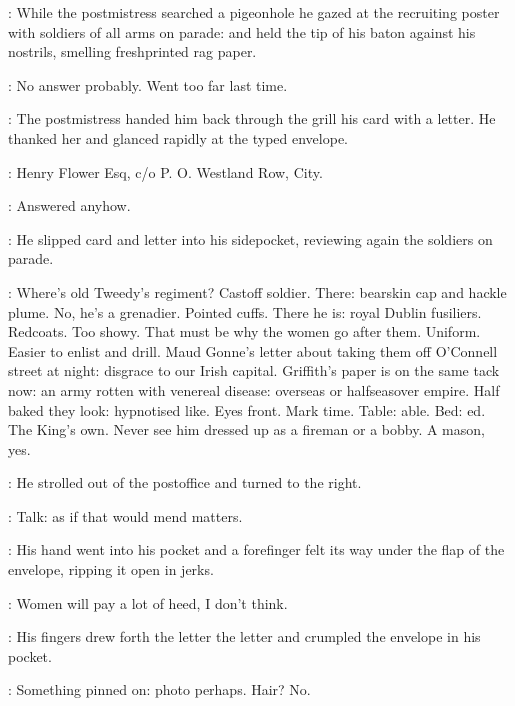 :
While the postmistress searched a pigeonhole
he gazed at the recruiting poster with soldiers of all arms on parade:
and held the tip of his baton against his nostrils,
smelling freshprinted rag paper.

\BloomInt:
No answer probably.
Went too far last time.

:
The postmistress handed him back through the grill
his card with a letter.
He thanked her and glanced rapidly at the typed envelope.

:
Henry Flower Esq,
c/o P. O. Westland Row,
City.

\BloomInt:
Answered anyhow.

:
He slipped card and letter into his sidepocket,
reviewing again the soldiers on parade.

\BloomInt:
Where's old Tweedy's regiment?
Castoff soldier.
There: bearskin cap and hackle plume.
No, he's a grenadier.
Pointed cuffs.
There he is: royal Dublin fusiliers.
Redcoats.
Too showy.
That must be why the women go after them.
Uniform.
Easier to enlist and drill.
Maud Gonne's letter about taking them off O'Connell street at night:
disgrace to our Irish capital.
Griffith's paper is on the same tack now:
an army rotten with venereal disease:
overseas or halfseasover empire.
Half baked they look:
hypnotised like.
Eyes front.
Mark time.
Table: able.
Bed: ed.
The King's own.
Never see him dressed up as a fireman or a bobby.
A mason, yes.

:
He strolled out of the postoffice and turned to the right.

\BloomInt:
Talk:
as if that would mend matters.

:
His hand went into his pocket
and a forefinger felt its way under the flap of the envelope,
ripping it open in jerks.

\BloomInt:
Women will pay a lot of heed, I don't think.

:
His fingers drew forth the letter
the letter and crumpled the envelope in his pocket.

\BloomInt:
Something pinned on:
photo perhaps.
Hair?
No.
